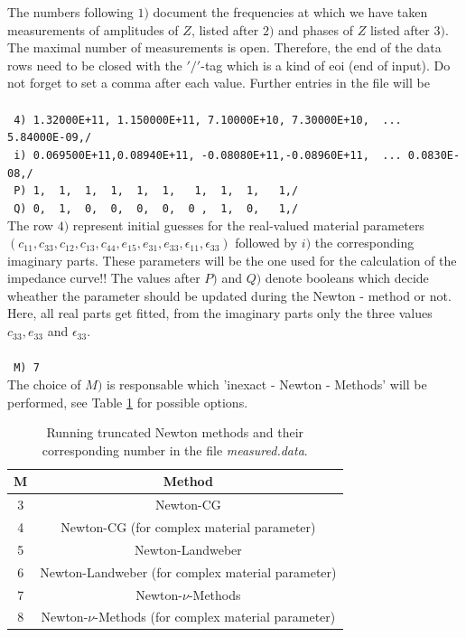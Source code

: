 \noindent The numbers following $1)$ document the frequencies at which we have taken measurements of amplitudes of $Z$, listed after $2)$ and phases of $Z$ listed after $3)$. The maximal number of measurements is open. Therefore, the end of the data rows need to be closed with the $'/'$-tag which is a kind of eoi (end of input). Do not forget to set a comma after each value. Further entries in the file will be 
\\ \\
\verb! 4) 1.32000E+11, 1.150000E+11, 7.10000E+10, 7.30000E+10,  ... 5.84000E-09,/ ! \\
\verb! i) 0.069500E+11,0.08940E+11, -0.08080E+11,-0.08960E+11,  ... 0.0830E-08,/!\\
\verb! P) 1,  1,  1,  1,  1,  1,   1,  1,  1,   1,/ !\\
\verb! Q) 0,  1,  0,  0,  0,  0,  0 ,  1,  0,   1,/!\\

\noindent The row $4)$ represent initial guesses for the real-valued material parameters\\ $(c_{11}, c_{33}, c_{12}, c_{13}, c_{44}, e_{15}, e_{31}, e_{33}, \epsilon_{11}, \epsilon_{33})$  followed by $i)$ the corresponding imaginary parts. These parameters will be the one used for the calculation of the impedance curve!!
The values after $P)$ and $Q)$ denote booleans which decide wheather the parameter should be updated during the Newton - method or not. Here, all real parts get fitted, from the imaginary parts only the three values $c_{33},e_{33}$ and $\epsilon_{33}$. \\ \\
\verb! M) 7! \\
\noindent
The choice of $M)$ is responsable which 'inexact - Newton - Methods' will be performed, see Table \ref{TableNewtonMethods} for possible options.

\begin{table}
\begin{center}
\begin{tabular}{|c|c|}
\hline \hline {\bf M} & {\bf Method} \\ 
\hline 3 & Newton-CG \\ 
\hline 4 & Newton-CG (for complex material parameter) \\ 
\hline 5 & Newton-Landweber \\ 
\hline 6 & Newton-Landweber (for complex material parameter) \\ 
\hline 7 & Newton-$\nu$-Methods  \\ 
\hline 8 & Newton-$\nu$-Methods  (for complex material parameter)\\ 
\hline 
\end{tabular} 
\label{TableNewtonMethods}
\caption{Running truncated Newton methods and their corresponding number in the file {\em measured.data}.}
\end{center}
\end{table}

